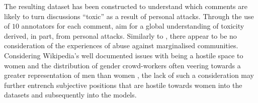 The resulting dataset has been constructed to understand which comments are likely to turn discussions ``toxic'' as a result of personal attacks. 
Through the use of $10$ annotators for each comment, \citet{Wulczyn:2017} aim for a global understanding of toxicity derived, in part, from personal attacks.
Similarly to \citet{Davidson:2017}, there appear to be no consideration of the experiences of abuse against marginalised communities.
Considering Wikipedia's well documented issues with being a hostile space to women \citep{Torres:2016} and the distribution of gender crowd-workers often veering towards a greater representation of men than women \citep{Posch:2018}, the lack of such a consideration may further entrench subjective positions that are hostile towards women into the datasets and subsequently into the models.

